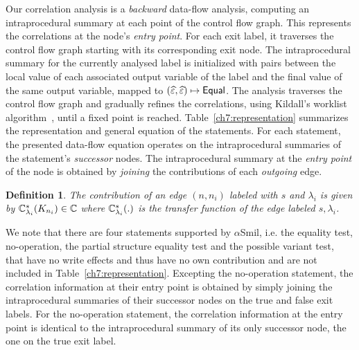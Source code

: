 \documentclass[11pt]{article}
\newtheorem{definition}{Definition}
\def\lbtrue{\textsf{true}}
\def\lbfalse{\textsf{false}}
\def\lbtrue{\textsf{true}}
\def\lbfalse{\textsf{false}}
\def\asmil{\textsf{$\alpha$Smil}}
\begin{document}
Our correlation analysis is a \emph{backward} data-flow analysis, computing an 
intraprocedural summary at each point of the control flow graph. This represents 
the correlations at the node's \emph{entry point}. For each exit label, it 
traverses the control flow graph starting with its corresponding exit node. The 
intraprocedural summary for the currently analysed label is initialized with 
pairs between the local value of each associated output variable of the label and 
the final value of the same output variable, mapped to 
$(\pempty, \pempty) \mapsto \equal$. The analysis traverses the control flow 
graph and gradually refines the correlations, using Kildall's worklist 
algorithm~\cite{kildall73}, until a fixed point is reached. 
Table~\ref{ch7:representation} summarizes the representation and general equation of 
the statements. For each statement, the presented data-flow equation operates 
on the intraprocedural summaries of the statement's \emph{successor} nodes. The 
intraprocedural summary at the \emph{entry point} of the node is obtained by 
\emph{joining} the contributions of each \emph{outgoing} edge. 

\begin{definition}\label{ch7:edgecontrib:definition}
The contribution 
of an edge $(n, n_i)$ labeled with $s$ and $\lambda_i$ is given by
$\Ctransfer {\intracor_{n_i}}{s}{\lambda_i} \in \mathbb{C}$ where 
$\Ctransfer{.}{s}{\lambda_i}$ is the \emph{transfer function} of the edge labeled 
$s, \lambda_i$. 
\end{definition}
\noindent We note that there are four statements supported by {\asmil}, 
i.e. the equality test, no-operation, the partial structure equality test and the
possible variant test, that have no write effects and thus have no own 
contribution and are not included in Table~\ref{ch7:representation}. Excepting the 
no-operation statement, the correlation information at their entry point is obtained 
by simply joining the intraprocedural summaries of their successor nodes on the 
{\lbtrue} and {\lbfalse} exit labels. For the no-operation statement, the correlation 
information at the entry point is identical to the intraprocedural summary of its 
only successor node, the one on the {\lbtrue} exit label.  
 
\end{document}
